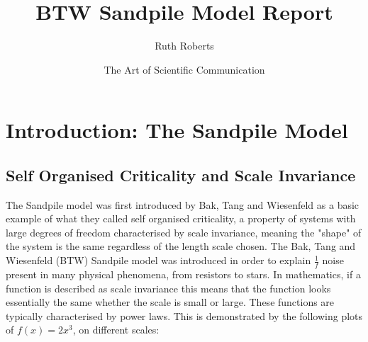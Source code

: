 \documentclass{article}
\title{BTW Sandpile Model Report}
\author{Ruth Roberts }
\date{The Art of Scientific Communication}
\begin{document}
\maketitle
\tableofcontents

\section{Introduction: The Sandpile Model }
\subsection{Self Organised Criticality and Scale Invariance}
The Sandpile model was first introduced by Bak, Tang and Wiesenfeld as a basic example of what they called self organised criticality, a property of systems with large degrees of freedom characterised by scale invariance, meaning the "shape" of the system is the same regardless of the length scale chosen. The Bak, Tang and Wiesenfeld (BTW) Sandpile model was introduced in order to explain $\frac{1}{f}$ noise present in many physical phenomena, from resistors to stars. In mathematics, if a function is described as scale invariance this means that the function looks essentially the same whether the scale is small or large. These functions are typically characterised by power laws. This is demonstrated by the following plots of $f(x) = 2x^3$, on different scales: 

\begin{center}
    
\end{center}
\begin{center}
\end{center}
\end{document}
